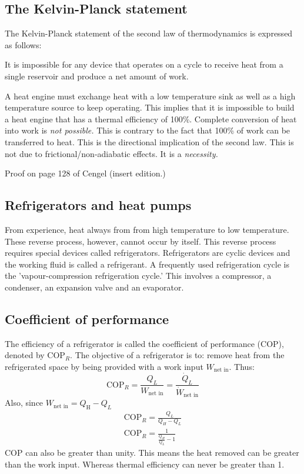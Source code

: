 \documentclass[class=report, crop=false, 12pt,a4paper]{standalone}
\begin{document}
\subsection{The Kelvin-Planck statement}
The Kelvin-Planck statement of the second law of thermodynamics is expressed as follows:
\begin{center}
  It is impossible for any device that operates on a cycle to receive heat from a single reservoir and produce a net amount of work.
\end{center}
A heat engine must exchange heat with a low temperature sink as well as a high temperature source to keep operating. This implies that it is impossible to build a heat engine that has a thermal efficiency of 100\%. Complete conversion of heat into work is \emph{not possible.} This is contrary to the fact that 100\% of work can be transferred to heat. This is the directional implication of the second law. This is not due to frictional/non-adiabatic effects. It is a \emph{necessity.}

Proof on page 128 of Cengel (insert edition.)
\subsection{Refrigerators and heat pumps}
From experience, heat always from from high temperature to low temperature. These reverse process, however, cannot occur by itself. This reverse process requires special devices called refrigerators. Refrigerators are cyclic devices and the working fluid is called a refrigerant. A frequently used refrigeration cycle is the 'vapour-compression refrigeration cycle.' This involves a compressor, a condenser, an expansion valve and an evaporator.
\subsection{Coefficient of performance}
The efficiency of a refrigerator is called the coefficient of performance (COP), denoted by \(\textrm{COP}_R\). The objective of a refrigerator is to: remove heat from the refrigerated space by being provided with a work input \(W_{\textrm{net in}}\). Thus:
\begin{equation}
  \textrm{COP}_R = \frac{Q_L}{W_{\textrm{net in}}} = \frac{\dot{Q}_L}{\dot{W}_{\textrm{net in}}} 
\end{equation}
Also, since \(W_{\textrm{net in}} = Q_{\textrm{H}} - Q_L\)
\begin{align}
  \textrm{COP}_R = \frac{Q_L}{Q_H-Q_L} \\
  \textrm{COP}_R = \frac{1}{\frac{Q_H}{Q_L} - 1}
\end{align}
COP can also be greater than unity. This means the heat removed can be greater than the work input. Whereas thermal efficiency can never be greater than 1. 
\end{document}
